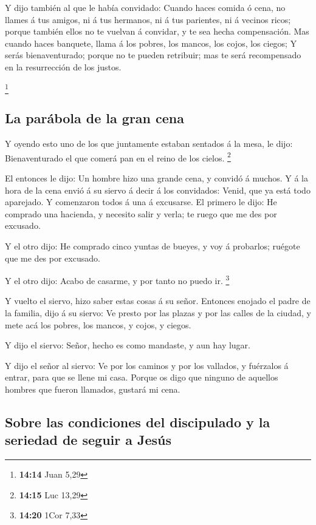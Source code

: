  Y dijo también al que le había convidado: Cuando haces
comida ó cena, no llames á tus amigos, ni á tus hermanos, ni á tus
parientes, ni á vecinos ricos; porque también ellos no te vuelvan á
convidar, y te sea hecha compensación.  Mas cuando haces
banquete, llama á los pobres, los mancos, los cojos, los ciegos;
 Y serás bienaventurado; porque no te pueden retribuir; mas
te será recompensado en la resurrección de los justos.

\footnote{\textbf{14:14} Juan 5,29}

\hypertarget{la-paruxe1bola-de-la-gran-cena}{%
\subsection{La parábola de la gran
cena}\label{la-paruxe1bola-de-la-gran-cena}}

 Y oyendo esto uno de los que juntamente estaban sentados á
la mesa, le dijo: Bienaventurado el que comerá pan en el reino de los
cielos. \footnote{\textbf{14:15} Luc 13,29}

 El entonces le dijo: Un hombre hizo una grande cena, y
convidó á muchos.  Y á la hora de la cena envió á su siervo
á decir á los convidados: Venid, que ya está todo aparejado.
 Y comenzaron todos á una á excusarse. El primero le dijo:
He comprado una hacienda, y necesito salir y verla; te ruego que me des
por excusado.

 Y el otro dijo: He comprado cinco yuntas de bueyes, y voy
á probarlos; ruégote que me des por excusado.

 Y el otro dijo: Acabo de casarme, y por tanto no puedo ir.
\footnote{\textbf{14:20} 1Cor 7,33}

 Y vuelto el siervo, hizo saber estas cosas á su señor.
Entonces enojado el padre de la familia, dijo á su siervo: Ve presto por
las plazas y por las calles de la ciudad, y mete acá los pobres, los
mancos, y cojos, y ciegos.

 Y dijo el siervo: Señor, hecho es como mandaste, y aun hay
lugar.

 Y dijo el señor al siervo: Ve por los caminos y por los
vallados, y fuérzalos á entrar, para que se llene mi casa. 
Porque os digo que ninguno de aquellos hombres que fueron llamados,
gustará mi cena.

\hypertarget{sobre-las-condiciones-del-discipulado-y-la-seriedad-de-seguir-a-jesuxfas}{%
\subsection{Sobre las condiciones del discipulado y la seriedad de
seguir a
Jesús}\label{sobre-las-condiciones-del-discipulado-y-la-seriedad-de-seguir-a-jesuxfas}}

